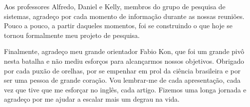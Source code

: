 Aos professores Alfredo, Daniel e Kelly, membros do grupo de pesquisa de
sistemas, agradeço por cada momento de informação durante as nossas reuniões.
Pouco a pouco, a partir daqueles momentos, foi se construindo o que hoje se
tornou formalmente meu projeto de pesquisa.

Finalmente, agradeço meu grande orientador Fabio Kon, que foi um grande pivô
nesta batalha e não mediu esforços para alcançarmos nossos objetivos. Obrigado
por cada puxão de orelhas, por se empenhar em prol da ciência brasileira e por
ser uma pessoa de grande coração. Vou lembrar-me de cada apresentação, cada vez
que tive que me esforçar no inglês, cada artigo. Fizemos uma longa jornada e
agradeço por me ajudar a escalar mais um degrau na vida.
%

%




\makeatletter
\if@openright\cleardoublepage\else\clearpage\fi
\makeatother


\newcommand\disablenewpage[1]{{\let\clearpage\par\let\cleardoublepage\par #1}}


